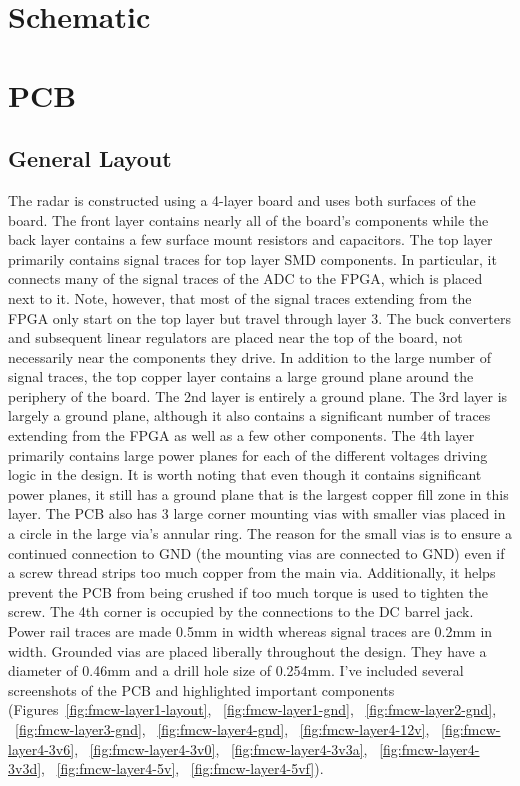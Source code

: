\documentclass{default}
\begin{document}

\chapter{Schematic}
\label{cha:schematic}











\chapter{PCB}
\label{cha:pcb}

\section{General Layout}

The radar is constructed using a 4-layer board and uses both surfaces of the board. The front layer
contains nearly all of the board's components while the back layer contains a few surface mount
resistors and capacitors. The top layer primarily contains signal traces for top layer SMD
components. In particular, it connects many of the signal traces of the ADC to the FPGA, which is
placed next to it. Note, however, that most of the signal traces extending from the FPGA only start
on the top layer but travel through layer 3. The buck converters and subsequent linear regulators
are placed near the top of the board, not necessarily near the components they drive. In addition to
the large number of signal traces, the top copper layer contains a large ground plane around the
periphery of the board. The 2nd layer is entirely a ground plane. The 3rd layer is largely a ground
plane, although it also contains a significant number of traces extending from the FPGA as well as a
few other components. The 4th layer primarily contains large power planes for each of the different
voltages driving logic in the design. It is worth noting that even though it contains significant
power planes, it still has a ground plane that is the largest copper fill zone in this layer. The
PCB also has 3 large corner mounting vias with smaller vias placed in a circle in the large via's
annular ring. The reason for the small vias is to ensure a continued connection to GND (the mounting
vias are connected to GND) even if a screw thread strips too much copper from the main
via. Additionally, it helps prevent the PCB from being crushed if too much torque is used to tighten
the screw. The 4th corner is occupied by the connections to the DC barrel jack. Power rail traces
are made 0.5mm in width whereas signal traces are 0.2mm in width. Grounded vias are placed liberally
throughout the design. They have a diameter of 0.46mm and a drill hole size of 0.254mm. I've
included several screenshots of the PCB and highlighted important components
(Figures~\ref{fig:fmcw-layer1-layout}, ~\ref{fig:fmcw-layer1-gnd}, ~\ref{fig:fmcw-layer2-gnd},
~\ref{fig:fmcw-layer3-gnd}, ~\ref{fig:fmcw-layer4-gnd}, ~\ref{fig:fmcw-layer4-12v},
~\ref{fig:fmcw-layer4-3v6}, ~\ref{fig:fmcw-layer4-3v0}, ~\ref{fig:fmcw-layer4-3v3a},
~\ref{fig:fmcw-layer4-3v3d}, ~\ref{fig:fmcw-layer4-5v}, ~\ref{fig:fmcw-layer4-5vf}).
\end{document}
